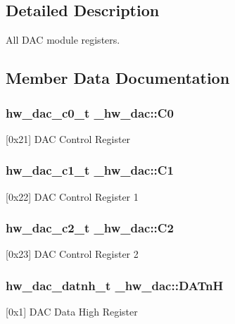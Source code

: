 \subsection{Detailed Description}
All D\+AC module registers. 

\subsection{Member Data Documentation}
\subsubsection[{\texorpdfstring{C0}{C0}}]{ {\bf hw\+\_\+dac\+\_\+c0\+\_\+t} \+\_\+hw\+\_\+dac\+::\+C0}\hypertarget{struct__hw__dac_a9236a838c2f58bf9b4091214e1124639}{}\label{struct__hw__dac_a9236a838c2f58bf9b4091214e1124639}
\mbox{[}0x21\mbox{]} D\+AC Control Register 
\subsubsection[{\texorpdfstring{C1}{C1}}]{ {\bf hw\+\_\+dac\+\_\+c1\+\_\+t} \+\_\+hw\+\_\+dac\+::\+C1}\hypertarget{struct__hw__dac_a43801d062f37cccbd7cf4d0aef22986f}{}\label{struct__hw__dac_a43801d062f37cccbd7cf4d0aef22986f}
\mbox{[}0x22\mbox{]} D\+AC Control Register 1 
\subsubsection[{\texorpdfstring{C2}{C2}}]{ {\bf hw\+\_\+dac\+\_\+c2\+\_\+t} \+\_\+hw\+\_\+dac\+::\+C2}\hypertarget{struct__hw__dac_a5ab203493ec2b6251baa9c3d6ca63b9d}{}\label{struct__hw__dac_a5ab203493ec2b6251baa9c3d6ca63b9d}
\mbox{[}0x23\mbox{]} D\+AC Control Register 2 
\subsubsection[{\texorpdfstring{D\+A\+TnH}{DATnH}}]{ {\bf hw\+\_\+dac\+\_\+datnh\+\_\+t} \+\_\+hw\+\_\+dac\+::\+D\+A\+TnH}\hypertarget{struct__hw__dac_a70491d703f0dc2b014d2e6bb6a4591a8}{}\label{struct__hw__dac_a70491d703f0dc2b014d2e6bb6a4591a8}
\mbox{[}0x1\mbox{]} D\+AC Data High Register 
